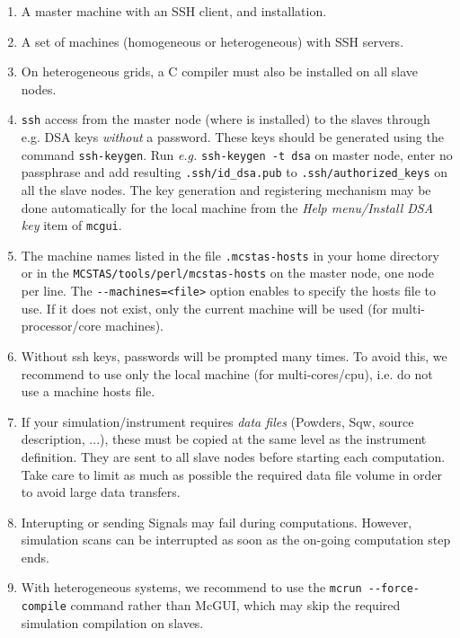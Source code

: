   \begin{enumerate}
  \item{A master machine with an SSH client, and \MCS installation.}
  \item{A set of machines (homogeneous or heterogeneous) with SSH servers.}
  \item{On heterogeneous grids, a C compiler must also be installed on all slave nodes.}
  \item{\texttt{ssh} access from the master node (where \MCS is
      installed) to the slaves through e.g. DSA keys \emph{without} a
      password. These keys should be generated using the command
      \texttt{ssh-keygen}. Run \emph{e.g.} \texttt{ssh-keygen -t dsa} on
      master node, enter no passphrase and add resulting
      \texttt{.ssh/id\_dsa.pub} to \texttt{.ssh/authorized\_keys}
      on all the slave nodes. The key generation and registering mechanism 
      may be done automatically for the local machine from the 
      \emph{Help menu/Install DSA key} item of \verb+mcgui+.}
  \item{The machine names listed in the file \texttt{.mcstas-hosts} in
      your home directory or in the \texttt{MCSTAS/tools/perl/mcstas-hosts} on
      the master node, one node per line. The \verb'--machines=<file>' option
      enables to specify the hosts file to use. If it does not exist, only 
      the current machine will be used (for multi-processor/core machines).}
  \item{Without ssh keys, passwords will be prompted many times. To avoid this, 
      we recommend to use only the local machine (for multi-cores/cpu), i.e. do
      not use a machine hosts file.}
  \item{If your simulation/instrument requires \emph{data files} (Powders, Sqw, source 
      description, ...), these must be copied at the same level as the instrument 
      definition. They are sent to all slave nodes before starting each computation.
      Take care to limit as much as possible the required data file volume in order
      to avoid large data transfers.}
  \item Interupting or sending Signals may fail during computations. However, 
  simulation scans can be interrupted as soon as the on-going computation 
  step ends.
  \item With heterogeneous systems, we recommend to use the \verb+mcrun --force-compile+ 
    command rather than McGUI, which may skip the required simulation compilation
    on slaves.
  \end{enumerate}

